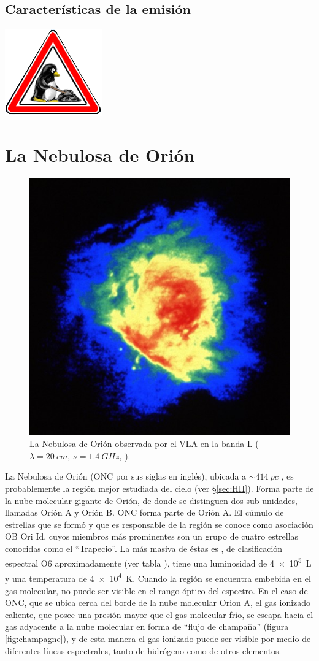\subsection{Características de la emisión}

\includegraphics[width=0.1\linewidth]{./Figures/tux-development}


\section{La Nebulosa de Orión}

\begin{figure}
    \includegraphics[width=0.5\linewidth]{./Figures/OrionVR13A} 
  \caption{La Nebulosa de Orión observada por el VLA en la banda L ($\lambda = \SI{20}{cm}$, $\nu = \SI{1.4}{GHz}$, \citet{Yusef:1990}).}
\end{figure}

La Nebulosa de Orión (ONC por sus siglas en inglés), ubicada a $\sim \SI{414}{pc}$ \citep{Menten:2007}, es probablemente la región  mejor estudiada del cielo (ver \S \ref{sec:HII}). Forma parte de la nube molecular gigante de Orión, de donde se distinguen dos sub-unidades, llamadas Orión A y Orión B. ONC forma parte de Orión A. El cúmulo de estrellas que se formó y que es responsable de la región  se conoce como asociación OB Ori Id, cuyos miembros más prominentes son un grupo de cuatro estrellas conocidas como el ``Trapecio''. La más masiva de éstas es \thC{}, de clasificación espectral O6 aproximadamente (ver tabla ), tiene una luminosidad de \SI{4e5}{L_\odot} y una temperatura de \SI{4e4}{K}. Cuando la región  se encuentra embebida en el gas molecular,  no puede ser visible en el rango óptico del espectro. En el caso de ONC, que se ubica cerca del borde de la nube molecular Orion A, el gas ionizado caliente, que posee una presión mayor que el gas molecular frío, se escapa hacia el gas adyacente a la nube molecular en forma de ``flujo de champaña'' (figura \ref{fig:champagne}), y de esta manera el gas ionizado puede ser visible por medio de diferentes líneas espectrales, tanto de hidrógeno como de otros elementos. 

